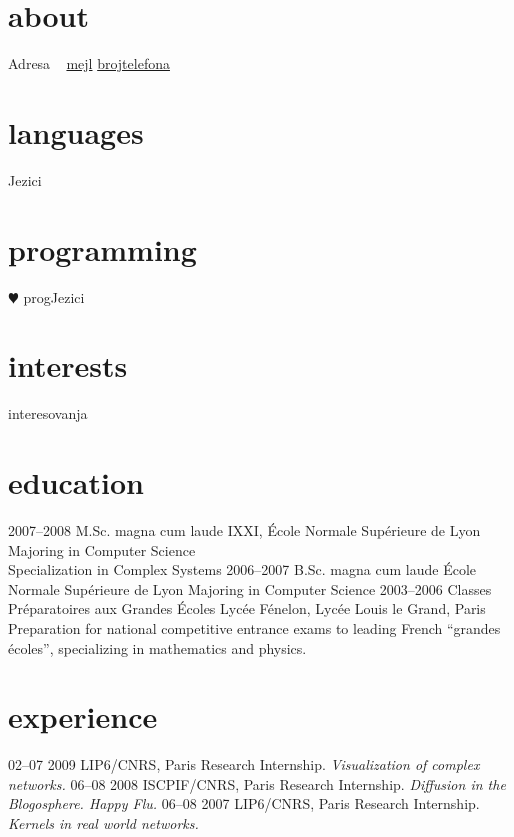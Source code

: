 \documentclass[]{friggeri-cv}
\begin{document}


\begin{aside}
  \section{about}
    Adresa
    ~
    \href{mailto:mejl}{mejl}
    \href{brojtelefona}{brojtelefona}
  \section{languages}
    Jezici
  \section{programming}
    {\color{red} $\varheartsuit$} progJezici
\end{aside}

\section{interests}

interesovanja

\section{education}

\begin{entrylist}
  \entry
    {2007–2008}
    {M.Sc. magna cum laude}
    {IXXI, École Normale Supérieure de Lyon}
    {Majoring in Computer Science\\
    Specialization in Complex Systems}
  \entry
    {2006–2007}
    {B.Sc. magna cum laude}
    {École Normale Supérieure de Lyon}
    {Majoring in Computer Science}
  \entry
    {2003–2006}
    {Classes Préparatoires aux Grandes Écoles}
    {Lycée Fénelon, Lycée Louis le Grand, Paris}
    {Preparation for national competitive entrance exams to leading French ``grandes écoles'', specializing in mathematics and physics.}
\end{entrylist}

\section{experience}

\begin{entrylist}
  \entry
    {02–07 2009}
    {LIP6/CNRS, Paris}
    {Research Internship.}
    {\emph{Visualization of complex networks.}}
  \entry
    {06–08 2008}
    {ISCPIF/CNRS, Paris}
    {Research Internship.}
    {\emph{Diffusion in the Blogosphere. Happy Flu.}}
  \entry
    {06–08 2007}
    {LIP6/CNRS, Paris}
    {Research Internship.}
    {\emph{Kernels in real world networks.}}
\end{entrylist}
\end{document}
